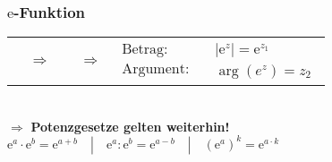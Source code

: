 			\subsubsection{$\mathrm{e}$-Funktion}
				\begin{tabular}{cccccc}
					\fbox{$\mathrm{e}^{\mathrm{j} \varphi}=\cos (\varphi)+\mathrm{j} \sin (\varphi)=\operatorname{cjs}(\varphi)$} 
					&
					$\Rightarrow$
					&
					\fbox{$\begin{aligned} \mathrm{e}^{z} &=\mathrm{e}^{z_{1}+\mathrm{j} z_{2}} \\ &=\mathrm{e}^{z_{1}} \cdot \mathrm{e}^{\mathrm{j} z_{2}} \\ &=\mathrm{e}^{z_{1}} \cdot \mathrm{c} \mathrm{j} \mathrm{s}\left(z_{2}\right) \end{aligned}$}
					&
					$\Rightarrow$
					&
					$\begin{array}{l}
						\text{Betrag:}\\
						\text{Argument}:
					\end{array}$
					&
					$\begin{array}{l}
						\left|\mathrm{e}^{z}\right|=\mathrm{e}^{z_{1}}\\
						\arg \left(e^{z}\right)=z_{2}
					\end{array}$
				\end{tabular}\\
				$\Rightarrow$ \textbf{Potenzgesetze gelten weiterhin!}\\[3pt]
				$\mathrm{e}^{a} \cdot \mathrm{e}^{b}=\mathrm{e}^{a+b} \quad\left|\quad \mathrm{e}^{a}: \mathrm{e}^{b}=\mathrm{e}^{a-b} \quad\right| \quad\left(\mathrm{e}^{a}\right)^{k}=\mathrm{e}^{a \cdot k}$
			
